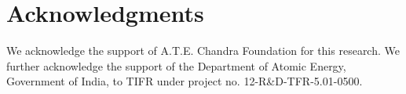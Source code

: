 \documentclass{article}
\newtheorem{remark}{Remark}
\theoremstyle{definition}
\begin{document}
    


  
  
   
 
    
  










 




\section*{Acknowledgments}
We  acknowledge the support of A.T.E. Chandra Foundation for this research.
We further  acknowledge the support of the Department of Atomic Energy, Government of India, to TIFR under project no. 12-R\&D-TFR-5.01-0500. 



%
%
\end{document}
